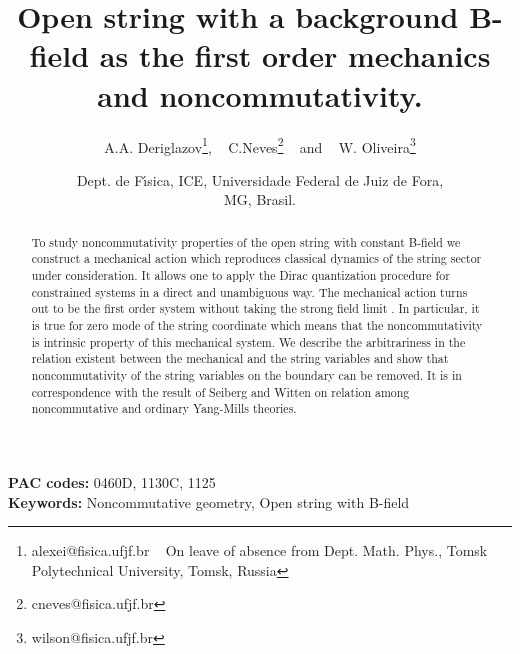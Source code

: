 \documentclass[a4paper]{article}
\title{Open string with a background B-field as the first order
mechanics and noncommutativity.}
\author{A.A. Deriglazov\footnote{alexei@fisica.ufjf.br ~ On leave of
absence from Dept. Math. Phys., Tomsk Polytechnical University,
Tomsk, Russia}, ~
C.Neves\footnote{cneves@fisica.ufjf.br} ~
and ~ W. Oliveira\footnote{wilson@fisica.ufjf.br}}
\date{Dept. de F\'\i sica, ICE, Universidade Federal de Juiz de Fora,\\
MG, Brasil.}
\begin{document}
\maketitle
\large
\begin{abstract}
To study noncommutativity properties of the open string with constant
B-field we construct a mechanical action which reproduces classical
dynamics of the string sector under consideration. It allows one to
apply the Dirac quantization procedure for constrained systems in
a direct and unambiguous way. The mechanical action turns out to be the
first order system without taking the strong field limit
\coordHE{}. In particular, it is true for zero mode
of the string
coordinate which means that the noncommutativity is intrinsic property
of this mechanical system. We describe the arbitrariness in the relation existent 
between the mechanical and the string variables and show that 
noncommutativity of the  string variables on the boundary can be removed. 
It is in correspondence with the result
of Seiberg and Witten on relation among noncommutative and ordinary
Yang-Mills theories.
\end{abstract}

{\bf PAC codes:} 0460D, 1130C, 1125 \\
{\bf Keywords:} Noncommutative geometry, Open string with B-field \\

\newpage
\end{document}
